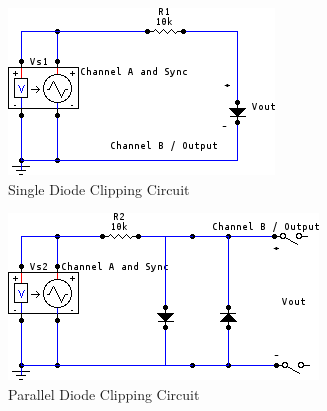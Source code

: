\documentclass[twocolumn,english]{IEEEtran}
\begin{document}
  \begin{figure}[htpb]
  \begin{centering}
  \begin{center}
  \includegraphics[width=\linewidth]{./Images/1.png}
  \caption{Single Diode Clipping Circuit}
  \label{fig:circuit_1a}
  \end{center}
  \par\end{centering}
  \end{figure}

  \begin{figure}[htpb]
  \begin{centering}
  \begin{center}
  \includegraphics[width=\linewidth]{./Images/2.png}
  \caption{Parallel Diode Clipping Circuit}
  \label{fig:circuit_1b}
  \end{center}
  \par\end{centering}
  \end{figure}
\end{document}
